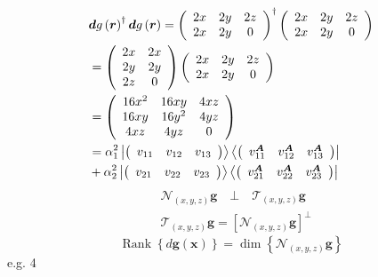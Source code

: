 \documentclass[aps,preprint]{revtex4}%
\begin{document}
\begin{align}
&  \boldsymbol{d}g\left(  \boldsymbol{r}\right)  ^{\dagger}\boldsymbol{d}%
g\left(  \boldsymbol{r}\right)  =\left(
\begin{array}
[c]{ccc}%
2x & 2y & 2z\\
2x & 2y & 0
\end{array}
\right)  ^{\dagger}\left(
\begin{array}
[c]{ccc}%
2x & 2y & 2z\\
2x & 2y & 0
\end{array}
\right) \nonumber\\
&  =\left(
\begin{array}
[c]{cc}%
2x & 2x\\
2y & 2y\\
2z & 0
\end{array}
\right)  \left(
\begin{array}
[c]{ccc}%
2x & 2y & 2z\\
2x & 2y & 0
\end{array}
\right) \\
&  =\left(
\begin{array}
[c]{ccc}%
16x^{2} & 16xy & 4xz\\
16xy & 16y^{2} & 4yz\\
4xz & 4yz & 0
\end{array}
\right) \nonumber\\
&  =\alpha_{1}^{2}\left\vert \left(
\begin{array}
[c]{ccc}%
v_{11} & v_{12} & v_{13}%
\end{array}
\right)  \right\rangle \left\langle \left(
\begin{array}
[c]{ccc}%
v_{11}^{\boldsymbol{A}} & v_{12}^{\boldsymbol{A}} & v_{13}^{\boldsymbol{A}}%
\end{array}
\right)  \right\vert \\
&  +\alpha_{2}^{2}\left\vert \left(
\begin{array}
[c]{ccc}%
v_{21} & v_{22} & v_{23}%
\end{array}
\right)  \right\rangle \left\langle \left(
\begin{array}
[c]{ccc}%
v_{21}^{\boldsymbol{A}} & v_{22}^{\boldsymbol{A}} & v_{23}^{\boldsymbol{A}}%
\end{array}
\right)  \right\vert
\end{align}%
\begin{align}
&  \mathcal{N}_{\left(  x,y,z\right)  }\boldsymbol{g\quad\bot\quad}%
\mathcal{T}_{\left(  x,y,z\right)  }\boldsymbol{g}\\
&  \mathcal{T}_{\left(  x,y,z\right)  }\boldsymbol{g}=\left[  \mathcal{N}%
_{\left(  x,y,z\right)  }\boldsymbol{g}\right]  ^{\bot}%
\end{align}%
\begin{equation}
\operatorname*{Rank}\left\{  d\boldsymbol{g}\left(  \boldsymbol{x}\right)
\right\}  =\dim\left\{  \mathcal{N}_{\left(  x,y,z\right)  }\boldsymbol{g}%
\right\}
\end{equation}
e.g. 4%
\end{document}
